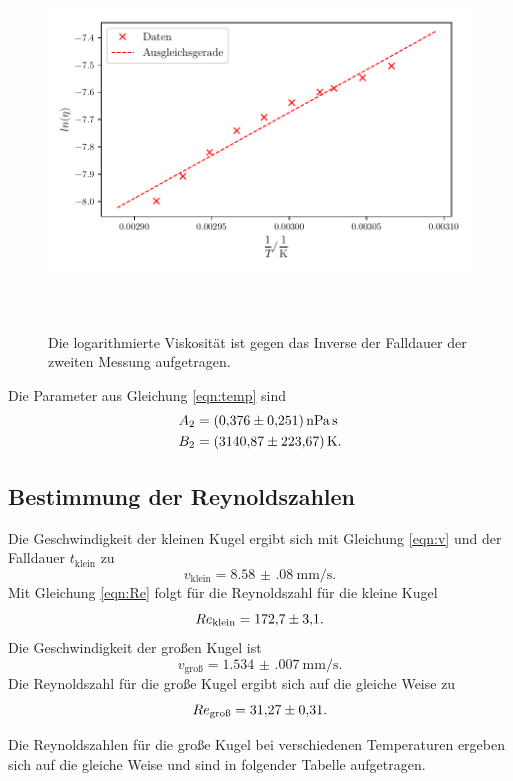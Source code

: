 \begin{figure}
    \centering
    \includegraphics[width=14cm, height=10cm]{build/plot2.pdf}
    \caption{Die logarithmierte Viskosität ist gegen das Inverse
    der Falldauer der zweiten Messung aufgetragen. }
    \label{fig:plot2}
\end{figure}

Die Parameter aus Gleichung \eqref{eqn:temp} sind 
\begin{align*} 
    A_2 &=\SI{0.376(251)}{\nano\pascal\second} \\
    B_2 &=\SI{3140.87 \pm 223.67}{\kelvin}. \\
\end{align*}


\subsection{Bestimmung der Reynoldszahlen}
Die Geschwindigkeit der kleinen Kugel ergibt sich mit Gleichung \eqref{eqn:v}
und der Falldauer $t_\text{klein}$ zu
\begin{equation*}
    v_\text{klein} = \SI{8.58(08)}{\milli\meter\per\second}.
\end{equation*}
Mit Gleichung \eqref{eqn:Re} folgt für die Reynoldszahl für die kleine Kugel
\begin{equation*}
    Re_\text{klein} = \num{172.7 \pm 3.1}.
\end{equation*}
Die Geschwindigkeit der großen Kugel ist
\begin{equation*}
    v_\text{groß} = \SI{1.534(007)}{\milli\meter\per\second}.
\end{equation*}
Die Reynoldszahl für die große Kugel ergibt sich auf die gleiche Weise zu
\begin{equation*}
    Re_\text{groß} = \num{31.27 \pm 0.31}.
\end{equation*}

\noindent Die Reynoldszahlen für die große Kugel bei verschiedenen Temperaturen ergeben sich auf die gleiche Weise und sind in folgender Tabelle aufgetragen. 


